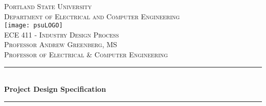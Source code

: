 \documentclass[11pt]{article}
\begin{document}

\begin{titlepage} %
	\newcommand{\HRule}{\rule{\linewidth}{0.5mm}} %
	
	\center %
	
	
	\textsc{\LARGE Portland State University
}\\[.25cm] %
	
	\textsc{\Large Department of Electrical and Computer Engineering }\\[.5cm] %
\texttt{[image: psuLOGO]}\\[.5cm]	
	\textsc{\LARGE ECE 411 - Industry Design Process }\\[0.75cm] %
	
		\textsc{\Large Professor Andrew Greenberg, MS\\
Professor of Electrical \& Computer Engineering
 }\\[.75cm]
	
	
	\HRule\\[0.4cm]
	
	{\huge\bfseries Project Design Specification}\\[0.4cm] %
	
	\HRule\\[1.5cm]
	
	
	

\end{titlepage}
\end{document}
